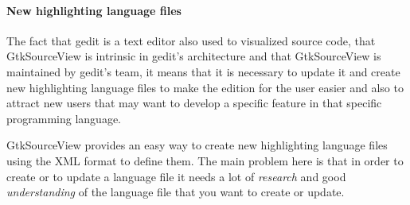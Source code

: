 \paragraph{New highlighting language files}

The fact that gedit is a text editor also used to visualized source code, that
GtkSourceView is intrinsic in gedit's architecture and that GtkSourceView is 
maintained by gedit's team, it means that it is necessary to update it and 
create new highlighting language files to make the edition for the user easier 
and also to attract new users that may want to develop a specific feature in 
that specific programming language.

GtkSourceView provides an easy way to create new highlighting language files 
using the XML format to define them. The main problem here is that in order to 
create or to update a language file it needs a lot of \emph{research} and good 
\emph{understanding} of the language file that you want to create or update.

